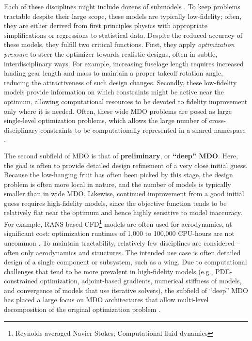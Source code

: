 \documentclass[12pt,vi,oneside]{report}
\begin{document}
    Each of these disciplines might include dozens of submodels \cite{cruz_weight_1989}. To keep problems tractable despite their large scope, these models are typically low-fidelity; often, they are either derived from first principles physics with appropriate simplifications or regressions to statistical data. Despite the reduced accuracy of these models, they fulfill two critical functions. First, they apply \textit{optimization pressure} to steer the optimizer towards realistic designs, often in subtle, interdisciplinary ways. For example, increasing fuselage length requires increased landing gear length and mass to maintain a proper takeoff rotation angle, reducing the attractiveness of such design changes. Secondly, these low-fidelity models provide information on which constraints might be active near the optimum, allowing computational resources to be devoted to fidelity improvement only where it is needed. Often, these wide MDO problems are posed as large single-level optimization problems, which allows the large number of cross-disciplinary constraints to be computationally represented in a shared namespace \cite{hoburg_geometric_2014}.

    The second subfield of MDO is that of \textbf{preliminary}, or \textbf{``deep'' MDO}. Here, the goal is often to provide detailed design refinement of a very close initial guess. Because the low-hanging fruit has often been picked by this stage, the design problem is often more local in nature, and the number of models is typically smaller than in wide MDO. Likewise, continued improvement from a good initial guess requires high-fidelity models, since the objective function tends to be relatively flat near the optimum and hence highly sensitive to model inaccuracy. For example, RANS-based CFD\footnote{Reynolds-averaged Navier-Stokes; Computational fluid dynamics} models are often used for aerodynamics, at significant cost: optimization runtimes of 1,000 to 100,000 CPU-hours are not uncommon \cite{kenway_multipoint_2014}. To maintain tractability, relatively few disciplines are considered -- often only aerodynamics and structures. The intended use case is often detailed design of a single component or subsystem, such as a wing. Due to computational challenges that tend to be more prevalent in high-fidelity models (e.g., PDE-constrained optimization, adjoint-based gradients, numerical stiffness of models, and convergence of models that use iterative solvers), the subfield of ``deep'' MDO has placed a large focus on MDO architectures that allow multi-level decomposition of the original optimization problem \cite{martins_multidisciplinary_2013}.
\end{document}
